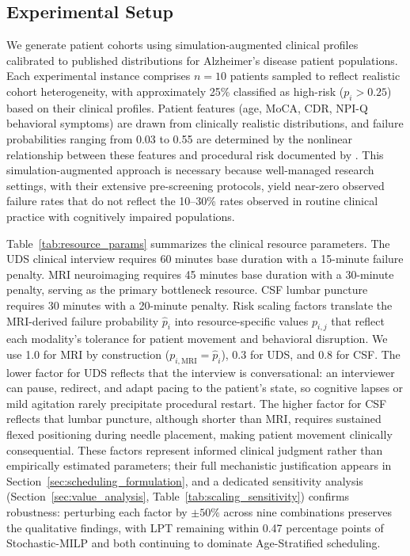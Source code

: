 \documentclass[11pt,a4paper]{article}
\begin{document}
\subsection{Experimental Setup}
\label{sec:experimental_setup}

We generate patient cohorts using simulation-augmented clinical profiles calibrated to published distributions for Alzheimer's disease patient populations. Each experimental instance comprises $n = 10$ patients sampled to reflect realistic cohort heterogeneity, with approximately 25\% classified as high-risk ($p_i > 0.25$) based on their clinical profiles. Patient features (age, MoCA, CDR, NPI-Q behavioral symptoms) are drawn from clinically realistic distributions, and failure probabilities ranging from 0.03 to 0.55 are determined by the nonlinear relationship between these features and procedural risk documented by \citet{porembka2025disparities}. This simulation-augmented approach is necessary because well-managed research settings, with their extensive pre-screening protocols, yield near-zero observed failure rates that do not reflect the 10--30\% rates observed in routine clinical practice with cognitively impaired populations.

Table~\ref{tab:resource_params} summarizes the clinical resource parameters. The UDS clinical interview requires 60 minutes base duration with a 15-minute failure penalty. MRI neuroimaging requires 45 minutes base duration with a 30-minute penalty, serving as the primary bottleneck resource. CSF lumbar puncture requires 30 minutes with a 20-minute penalty. Risk scaling factors translate the MRI-derived failure probability $\hat{p}_i$ into resource-specific values $p_{i,j}$ that reflect each modality's tolerance for patient movement and behavioral disruption. We use 1.0 for MRI by construction ($p_{i,\text{MRI}} = \hat{p}_i$), 0.3 for UDS, and 0.8 for CSF. The lower factor for UDS reflects that the interview is conversational: an interviewer can pause, redirect, and adapt pacing to the patient's state, so cognitive lapses or mild agitation rarely precipitate procedural restart. The higher factor for CSF reflects that lumbar puncture, although shorter than MRI, requires sustained flexed positioning during needle placement, making patient movement clinically consequential. These factors represent informed clinical judgment rather than empirically estimated parameters; their full mechanistic justification appears in Section~\ref{sec:scheduling_formulation}, and a dedicated sensitivity analysis (Section~\ref{sec:value_analysis}, Table~\ref{tab:scaling_sensitivity}) confirms robustness: perturbing each factor by $\pm 50\%$ across nine combinations preserves the qualitative findings, with LPT remaining within 0.47 percentage points of Stochastic-MILP and both continuing to dominate Age-Stratified scheduling.
\end{document}
